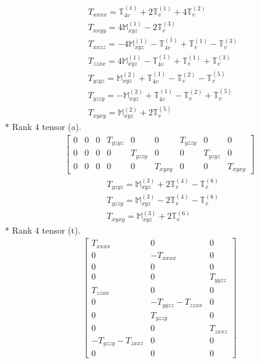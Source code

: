 \documentclass[fleqn,8pt,landscape]{jsarticle}
\begin{document}
\begin{align*}
& T_{xxxx} = \mathbb{T}_{4v}^{(1)} + 2 \mathbb{T}_{v}^{(1)} + 4 \mathbb{T}_{v}^{(2)} \\
& T_{xxyy} = 4 \mathbb{M}_{xyz}^{(1)} - 2 \mathbb{T}_{v}^{(3)} \\
& T_{xxzz} = - 4 \mathbb{M}_{xyz}^{(1)} - \mathbb{T}_{4v}^{(1)} + \mathbb{T}_{v}^{(1)} - \mathbb{T}_{v}^{(3)} \\
& T_{zzxx} = 4 \mathbb{M}_{xyz}^{(1)} - \mathbb{T}_{4v}^{(1)} + \mathbb{T}_{v}^{(1)} + \mathbb{T}_{v}^{(3)} \\
& T_{yzyz} = \mathbb{M}_{xyz}^{(2)} + \mathbb{T}_{4v}^{(1)} - \mathbb{T}_{v}^{(2)} - \mathbb{T}_{v}^{(5)} \\
& T_{yzzy} = - \mathbb{M}_{xyz}^{(2)} + \mathbb{T}_{4v}^{(1)} - \mathbb{T}_{v}^{(2)} + \mathbb{T}_{v}^{(5)} \\
& T_{xyxy} = \mathbb{M}_{xyz}^{(2)} + 2 \mathbb{T}_{v}^{(5)}
\end{align*}
* Rank 4 tensor (a).
\begin{align*}
\begin{bmatrix} 0 & 0 & 0 & T_{yzyz} & 0 & 0 & T_{yzzy} & 0 & 0 \\ 0 & 0 & 0 & 0 & T_{yzzy} & 0 & 0 & T_{yzyz} & 0 \\ 0 & 0 & 0 & 0 & 0 & T_{xyxy} & 0 & 0 & T_{xyxy} \end{bmatrix}
\end{align*}
\begin{align*}
& T_{yzyz} = \mathbb{M}_{xyz}^{(3)} + 2 \mathbb{T}_{v}^{(4)} - \mathbb{T}_{v}^{(6)} \\
& T_{yzzy} = \mathbb{M}_{xyz}^{(3)} - 2 \mathbb{T}_{v}^{(4)} - \mathbb{T}_{v}^{(6)} \\
& T_{xyxy} = \mathbb{M}_{xyz}^{(3)} + 2 \mathbb{T}_{v}^{(6)}
\end{align*}
* Rank 4 tensor (t).
\begin{align*}
\begin{bmatrix} T_{xxxx} & 0 & 0 \\ 0 & - T_{xxxx} & 0 \\ 0 & 0 & 0 \\ 0 & 0 & T_{yyzz} \\ T_{zzxx} & 0 & 0 \\ 0 & - T_{yyzz} - T_{zzxx} & 0 \\ 0 & T_{yzzy} & 0 \\ 0 & 0 & T_{zxxz} \\ - T_{yzzy} - T_{zxxz} & 0 & 0 \\ 0 & 0 & 0 \end{bmatrix}
\end{align*}
\end{document}
